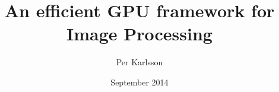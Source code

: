 \documentclass[a4paper,12pt]{article}
\begin{document}
\title{An efficient GPU framework for Image Processing}
\author{Per Karlsson}
\date{September 2014}
\maketitle

\setlength\parindent{0pt}



\tableofcontents
\setcounter{tocdepth}{2}










\end{document}
